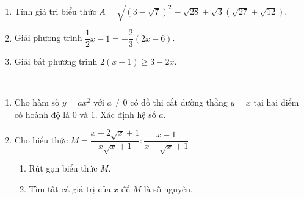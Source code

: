 \setcounter{deso}{4}
\begin{name}
	{\tenchude}
	{\tendethi}
	{\tentruong}
	{\thoigian}
\end{name}
\begin{bt}[1,5 điểm]~
\begin{enumerate}[1.]
    \item Tính giá trị biểu thức $A=\sqrt{(3-\sqrt{7})^2}-\sqrt{28}+\sqrt{3}(\sqrt{27}+\sqrt{12})$.
    \item Giải phương trình $\dfrac{1}{2}x-1=-\dfrac{2}{3}(2x-6)$.
    \item Giải bất phương trình $2(x-1) \ge 3-2x$.
\end{enumerate}
\end{bt}

\begin{bt}[2,0 điểm]~
\begin{enumerate}[1.]
    \item Cho hàm số $y=ax^2$ với $a \ne 0$ có đồ thị cắt đường thẳng $y=x$ tại hai điểm có hoành độ là $0$ và $1$. Xác định hệ số $a$.
    \item Cho biểu thức $M=\dfrac{x+2\sqrt{x}+1}{x\sqrt{x}+1} : \dfrac{x-1}{x-\sqrt{x}+1}$
    \begin{enumerate}
        \item Rút gọn biểu thức $M$.
        \item Tìm tất cả giá trị của $x$ để $M$ là số nguyên.
    \end{enumerate}
\end{enumerate}
\end{bt}
